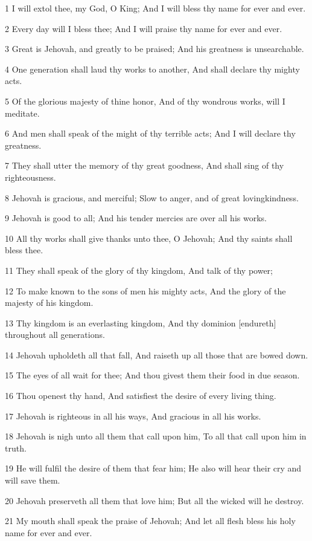 \par 1 I will extol thee, my God, O King; And I will bless thy name for ever and ever.
\par 2 Every day will I bless thee; And I will praise thy name for ever and ever.
\par 3 Great is Jehovah, and greatly to be praised; And his greatness is unsearchable.
\par 4 One generation shall laud thy works to another, And shall declare thy mighty acts.
\par 5 Of the glorious majesty of thine honor, And of thy wondrous works, will I meditate.
\par 6 And men shall speak of the might of thy terrible acts; And I will declare thy greatness.
\par 7 They shall utter the memory of thy great goodness, And shall sing of thy righteousness.
\par 8 Jehovah is gracious, and merciful; Slow to anger, and of great lovingkindness.
\par 9 Jehovah is good to all; And his tender mercies are over all his works.
\par 10 All thy works shall give thanks unto thee, O Jehovah; And thy saints shall bless thee.
\par 11 They shall speak of the glory of thy kingdom, And talk of thy power;
\par 12 To make known to the sons of men his mighty acts, And the glory of the majesty of his kingdom.
\par 13 Thy kingdom is an everlasting kingdom, And thy dominion [endureth] throughout all generations.
\par 14 Jehovah upholdeth all that fall, And raiseth up all those that are bowed down.
\par 15 The eyes of all wait for thee; And thou givest them their food in due season.
\par 16 Thou openest thy hand, And satisfiest the desire of every living thing.
\par 17 Jehovah is righteous in all his ways, And gracious in all his works.
\par 18 Jehovah is nigh unto all them that call upon him, To all that call upon him in truth.
\par 19 He will fulfil the desire of them that fear him; He also will hear their cry and will save them.
\par 20 Jehovah preserveth all them that love him; But all the wicked will he destroy.
\par 21 My mouth shall speak the praise of Jehovah; And let all flesh bless his holy name for ever and ever.


